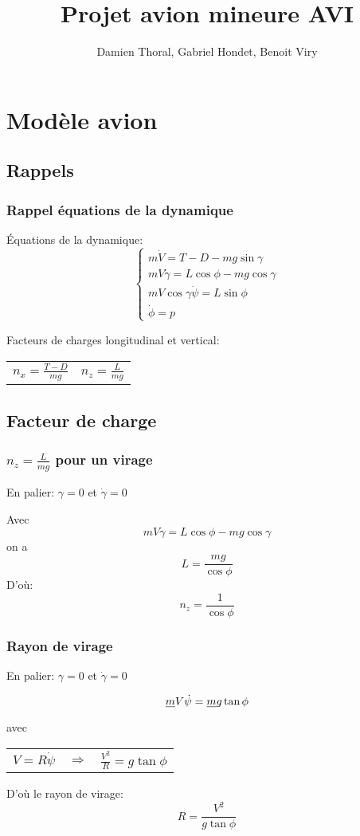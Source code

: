 \documentclass[footheight=2em]{beamer}
\title{Projet avion mineure AVI}
\author{Damien Thoral, Gabriel Hondet, Benoit Viry}
\date{}
\begin{document}
\frame{\titlepage}

\section{Modèle avion}
\subsection{Rappels}
\begin{frame}
    \frametitle{Rappel équations de la dynamique} \pause{}
    \'Equations de la dynamique:
    \[
    \left \{
    \begin{array}{l}
        m\dot{V} = T - D - mg\sin \gamma \\
        mV\dot{\gamma} = L\cos \phi - mg \cos \gamma \\
        mV \cos \gamma \dot{\psi} = L \sin \phi \\
        \dot{\phi} = p
    \end{array}
    \right.
    \]

    Facteurs de charges longitudinal et vertical:

    \begin{center}
        \begin{tabular}{cc}
            \(n_x = \frac{T - D}{mg}\) & \(n_z = \frac{L}{mg}\)
        \end{tabular}
    \end{center}
\end{frame}

\subsection{Facteur de charge}
\begin{frame}
    \frametitle{\(n_z = \frac{L}{mg}\) pour un virage}\pause{}
    En palier: \(\gamma = 0\) et \(\dot{\gamma} = 0\) \pause{}

    Avec \[ mV\dot{\gamma} = L\cos \phi - mg \cos \gamma \]
    on a \[ L=\frac{mg}{\cos \phi}\] \pause{}
    D'où:\[ \boxed{n_z = \frac{1}{\cos \phi}}\]
\end{frame}

\begin{frame}
    \frametitle{Rayon de virage}\pause{}
    En palier: \(\gamma = 0\) et \(\dot{\gamma} = 0\) \pause{}

    \[ \sout{m}V\dot{\psi} = \sout{m}g\tan \phi \] \pause{}
    avec

    \begin{center}
        \begin{tabular}{ccc}
            \(V = R\dot{\psi}\) & \(\Longrightarrow \) &
            \(\frac{V^2}{R} = g \tan \phi \)
        \end{tabular}
    \end{center}\pause{}

    D'où le rayon de virage:
    \[ \boxed{R = \frac{V^2}{g\tan \phi}}\]
\end{frame}
\end{document}
